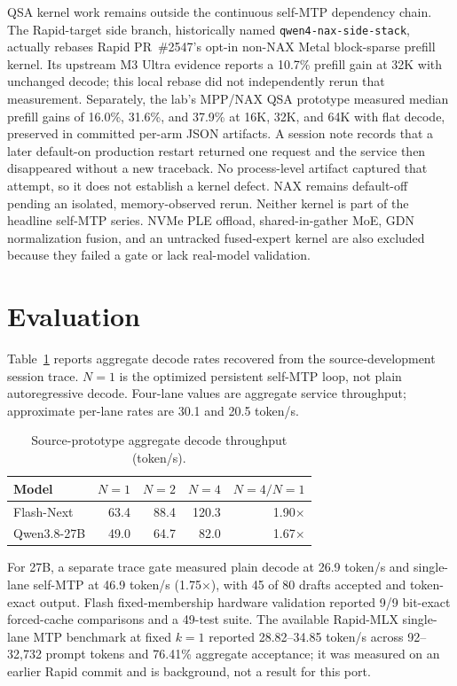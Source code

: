 \documentclass[10pt,twocolumn]{article}
\begin{document}
QSA kernel work remains outside the continuous self-MTP dependency chain.  The
Rapid-target side branch, historically named \texttt{qwen4-nax-side-stack},
actually rebases Rapid PR~\#2547's opt-in non-NAX Metal block-sparse prefill
kernel.  Its upstream M3 Ultra evidence reports a 10.7\% prefill gain at 32K
with unchanged decode; this local rebase did not independently rerun that
measurement.  Separately, the lab's MPP/NAX QSA prototype measured median
prefill gains of 16.0\%, 31.6\%, and 37.9\% at 16K, 32K, and 64K with flat
decode, preserved in committed per-arm JSON artifacts.  A session note records
that a later default-on production restart returned one request and the service
then disappeared without a new traceback.  No process-level artifact captured
that attempt, so it does not establish a kernel defect.  NAX remains
default-off pending an isolated, memory-observed rerun.  Neither kernel is part
of the headline self-MTP series.  NVMe PLE offload, shared-in-gather MoE, GDN normalization
fusion, and an untracked fused-expert kernel are also excluded because they
failed a gate or lack real-model validation.

\section{Evaluation}
Table~\ref{tab:throughput} reports aggregate decode rates recovered from the
source-development session trace.  $N=1$ is the optimized persistent self-MTP
loop, not plain autoregressive decode.  Four-lane values are aggregate service
throughput; approximate per-lane rates are 30.1 and 20.5 token/s.

\begin{table}[h]
\centering
\caption{Source-prototype aggregate decode throughput (token/s).}
\label{tab:throughput}
\begin{tabular}{lrrrr}
\toprule
Model & $N=1$ & $N=2$ & $N=4$ & $N=4/N=1$ \\
\midrule
Flash-Next & 63.4 & 88.4 & 120.3 & 1.90$\times$ \\
Qwen3.8-27B & 49.0 & 64.7 & 82.0 & 1.67$\times$ \\
\bottomrule
\end{tabular}
\end{table}

For 27B, a separate trace gate measured plain decode at 26.9 token/s and
single-lane self-MTP at 46.9 token/s (1.75$\times$), with 45 of 80 drafts
accepted and token-exact output.  Flash fixed-membership hardware validation
reported 9/9 bit-exact forced-cache comparisons and a 49-test suite.  The
available Rapid-MLX single-lane MTP benchmark at fixed $k=1$ reported
28.82--34.85 token/s across 92--32,732 prompt tokens and 76.41\% aggregate
acceptance; it was measured on an earlier Rapid commit and is background, not
a result for this port.
\end{document}
